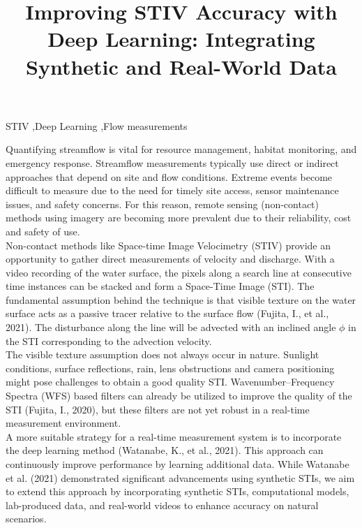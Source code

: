 \documentclass[preprint,12pt]{elsarticle}
\begin{document}
\begin{frontmatter}

\title{Improving STIV Accuracy with Deep Learning: Integrating Synthetic and Real-World Data}

\begin{keyword}
STIV \sep Deep Learning \sep Flow measurements
\end{keyword}

\end{frontmatter}

\linenumbers

Quantifying streamflow is vital for resource management, habitat monitoring, and emergency response. Streamflow measurements typically use direct or indirect approaches that depend on site and flow conditions. Extreme events become difficult to measure due to the need for timely site access, sensor maintenance issues, and safety concerns. For this reason, remote sensing (non-contact) methods using imagery are becoming more prevalent due to their reliability, cost and safety of use.
\\
Non-contact methods like Space-time Image Velocimetry (STIV) provide an opportunity to gather direct measurements of velocity and discharge. With a video recording of the water surface, the pixels along a search line at consecutive time instances can be stacked and form a Space-Time Image (STI). The fundamental assumption behind the technique is that visible texture on the water surface acts as a passive tracer relative to the surface flow (Fujita, I., et al., 2021). The disturbance along the line will be advected with an inclined angle $\phi$ in the STI corresponding to the advection velocity.
\\
The visible texture assumption does not always occur in nature. Sunlight conditions, surface reflections, rain, lens obstructions and camera positioning might pose challenges to obtain a good quality STI. Wavenumber–Frequency Spectra (WFS) based filters can already be utilized to improve the quality of the STI (Fujita, I., 2020), but these filters are not yet robust in a real-time measurement environment.
\\
A more suitable strategy for a real-time measurement system is to incorporate the deep learning method (Watanabe, K., et al., 2021). This approach can continuously improve performance by learning additional data. While Watanabe et al. (2021) demonstrated significant advancements using synthetic STIs, we aim to extend this approach by incorporating synthetic STIs, computational models, lab-produced data, and real-world videos to enhance accuracy on natural scenarios.
\end{document}
